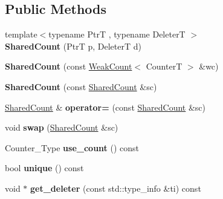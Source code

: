 \subsection*{Public Methods}
\begin{DoxyCompactItemize}
\item 
\mbox{\label{classcugar_1_1internals_1_1_shared_count_a50c2b0a21fa72d090324b86eeb80b893}} 
{\footnotesize template$<$typename PtrT , typename DeleterT $>$ }\\{\bfseries Shared\+Count} (PtrT p, DeleterT d)
\item 
\mbox{\label{classcugar_1_1internals_1_1_shared_count_a292f13e3f149574d88ecd8e63b28650d}} 
{\bfseries Shared\+Count} (const \hyperlink{classcugar_1_1internals_1_1_weak_count}{Weak\+Count}$<$ CounterT $>$ \&wc)
\item 
\mbox{\label{classcugar_1_1internals_1_1_shared_count_af4405588eab5a6807daeb79a95385854}} 
{\bfseries Shared\+Count} (const \hyperlink{classcugar_1_1internals_1_1_shared_count}{Shared\+Count} \&sc)
\item 
\mbox{\label{classcugar_1_1internals_1_1_shared_count_a3e276c9c8e31e362f673362ec215db13}} 
\hyperlink{classcugar_1_1internals_1_1_shared_count}{Shared\+Count} \& {\bfseries operator=} (const \hyperlink{classcugar_1_1internals_1_1_shared_count}{Shared\+Count} \&sc)
\item 
\mbox{\label{classcugar_1_1internals_1_1_shared_count_ae6f676bcca4a0fb3aab08b90c6732c73}} 
void {\bfseries swap} (\hyperlink{classcugar_1_1internals_1_1_shared_count}{Shared\+Count} \&sc)
\item 
\mbox{\label{classcugar_1_1internals_1_1_shared_count_a1786236a0e31493180162fc7527a97a0}} 
Counter\+\_\+\+Type {\bfseries use\+\_\+count} () const
\item 
\mbox{\label{classcugar_1_1internals_1_1_shared_count_a4c9c11d2ae4915320151a62f54d3c912}} 
bool {\bfseries unique} () const
\item 
\mbox{\label{classcugar_1_1internals_1_1_shared_count_a49ade43d593df14b17c71ddf96091e87}} 
void $\ast$ {\bfseries get\+\_\+deleter} (const std\+::type\+\_\+info \&ti) const
\end{DoxyCompactItemize}
